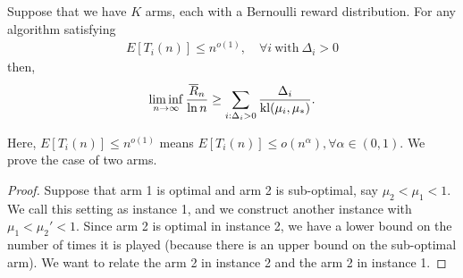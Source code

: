\begin{thm}
    Suppose that we have $K$ arms,
    each with a Bernoulli reward distribution.
    For any algorithm satisfying
    \begin{align}
        E[T_i(n)] \le n^{o(1)}, \quad\forall i ~\text{with}~ \Delta_i>0
    \end{align}
    then,
    \begin{align}
        \liminf_{n\to\infty} \frac{{\overline{R}}_n}{\ln n} \ge \sum_{i:\Delta_i>0} \frac{\Delta_i}{{\mathop{\mathrm{kl}}}(\mu_i,\mu_*)}.
    \end{align}
\end{thm}
Here, $E[T_i(n)] \le n^{o(1)}$ means $E[T_i(n)] \le o(n^\alpha), \forall \alpha\in(0,1)$.
We prove the case of two arms.
\begin{proof}
    Suppose that arm 1 is optimal and arm 2 is sub-optimal, say $\mu_2<\mu_1<1$.
    We call this setting as instance 1, and
    we construct another instance with $\mu_1<\mu_2'<1$.
    Since arm 2 is optimal in instance 2,
    we have a lower bound on the number of times it is played
    (because there is an upper bound on the sub-optimal arm).
    We want to relate the arm 2 in instance 2 and the arm 2 in instance 1.


\end{proof}
